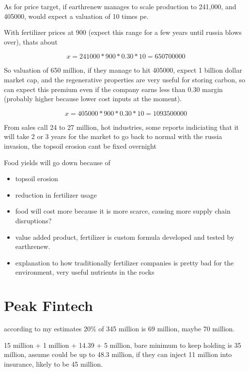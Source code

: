 As for price target, if earthrenew manages to scale production to 241,000, and 405000, would expect a valuation of 10 times pe.

With fertilizer prices at 900 (expect this range for a few years until russia blows over), thats about 

\begin{equation}
  x = 241000*900*0.30*10 = 650700000
\end{equation}

So valuation of 650 million, if they manage to hit 405000, expect 1 billion dollar market cap, and the regenerative properties are very useful for storing carbon, so can expect this premium even if the company earns less than 0.30 margin (probably higher because lower cost inputs at the moment).

\begin{equation}
  x = 405000*900*0.30*10 = 1093500000
\end{equation}


From sales call 24 to 27 million, hot industries, some reports indiciating that it will take 2 or 3 years for the market to go back to normal with the russia invasion, the topsoil erosion cant be fixed overnight

Food yields will go down because of

\begin{itemize}
    \item topsoil erosion
    \item reduction in fertilizer usage
    \item food will cost more because it is more scarce, causing more supply chain disruptions?
    \item value added product, fertilizer is custom formula developed and tested by earthrenew.
    \item explanation to how traditionally fertilizer companies is pretty bad for the environment, very useful nutrients in the rocks
\end{itemize}

\section{Peak Fintech}

according to my estimates 20\% of 345 million is 69 million, maybe 70 million.

15 million + 1 million + 14.39 + 5 million, bare minimum to keep holding is 35 million, assume could be up to 48.3 million, if they can inject 11 million into insurance, likely to be 45 million. 

